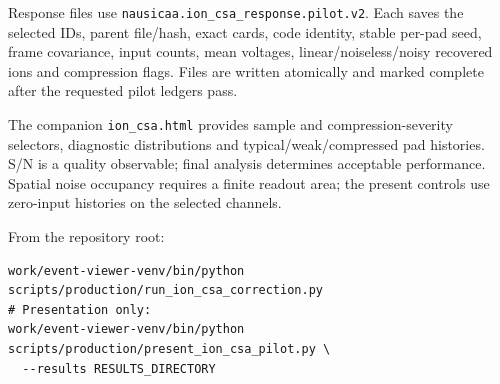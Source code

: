 \documentclass[10pt,a4paper]{article}
\begin{document}
Response files use \texttt{nausicaa.ion\_csa\_response.pilot.v2}. Each saves the
selected IDs, parent file/hash, exact cards, code identity, stable per-pad seed,
frame covariance, input counts, mean voltages, linear/noiseless/noisy recovered
ions and compression flags. Files are written atomically and marked complete
after the requested pilot ledgers pass.

The companion \texttt{ion\_csa.html} provides sample and compression-severity
selectors, diagnostic distributions and typical/weak/compressed pad histories.
S/N is a quality observable; final analysis determines acceptable performance.
Spatial noise occupancy requires a finite readout area; the present controls
use zero-input histories on the selected channels.

From the repository root:
\begin{verbatim}
work/event-viewer-venv/bin/python scripts/production/run_ion_csa_correction.py
# Presentation only:
work/event-viewer-venv/bin/python scripts/production/present_ion_csa_pilot.py \
  --results RESULTS_DIRECTORY
\end{verbatim}
\end{document}
